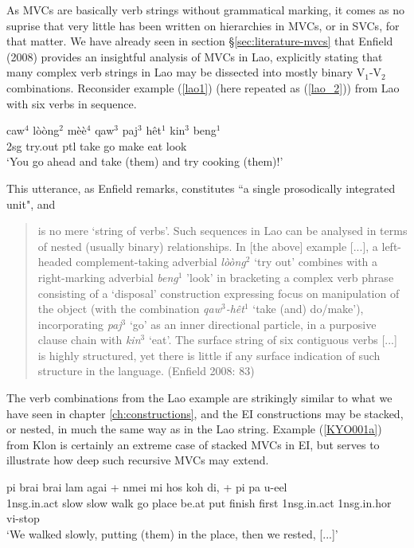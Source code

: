 As MVCs are basically verb strings without grammatical marking, it comes as no suprise that very little has been written on hierarchies in MVCs, or in SVCs, for that matter. We have already seen in section §\ref{sec:literature-mvcs} that Enfield (2008) provides an insightful analysis of MVCs in Lao, explicitly stating that many complex verb strings in Lao may be dissected into mostly binary V$_1$-V$_2$ combinations. Reconsider example (\ref{lao1}) (here repeated as (\ref{lao_2})) from Lao with six verbs in sequence.

\ea \label{lao_2}
\gll caw$^4$ lòòng$^2$ mèè$^4$ qaw$^3$ paj$^3$ hêt$^1$ kin$^3$ beng$^1$ \\
2\acs{sg} try.out \acs{ptl} take go make eat look \\
\glft `You go ahead and take (them) and try cooking (them)!' \\ 
\z
\xe

This utterance, as Enfield remarks, constitutes ``a single prosodically integrated unit", and \begin{quote}is no mere `string of verbs'. Such sequences in Lao can be analysed in terms of nested (usually binary) relationships. In [the above] example [...], a left-headed complement-taking adverbial \textit{lòòng$^2$} `try out' combines with a right-marking adverbial \textit{beng$^1$} 'look' in bracketing a complex verb phrase consisting of a `disposal' construction expressing focus on manipulation of the object (with the combination \textit{qaw$^3$-hêt$^1$} `take (and) do/make'), incorporating \textit{paj$^3$} `go' as an inner directional particle, in a purposive clause chain with \textit{kin$^3$} `eat'. The surface string of six contiguous verbs [...] is highly structured, yet there is little if any surface indication of such structure in the language. (Enfield 2008: 83)\end{quote}

The verb combinations from the Lao example are strikingly similar to what we have seen in chapter \ref{ch:constructions}, and the EI constructions may be stacked, or nested, in much the same way as in the Lao string. Example (\ref{KYO001a}) from Klon is certainly an extreme case of stacked MVCs in EI, but serves to illustrate how deep such recursive MVCs may extend. 

\ea \label{KYO001a}
\gll pi brai brai lam agai + nmei mi hos koh di, + pi pa u-eel\\
\acs{1}\acs{nsg}.\acs{in}.\acs{act} slow slow walk go place be.at put finish first \acs{1}\acs{nsg}.\acs{in}.\acs{act} \acs{1}\acs{nsg}.\acs{in}.\acs{hor} \acs{vi}-stop\\
\glft `We walked slowly, putting (them) in the place, then we rested, [...]' \\ 
\z
\xe

